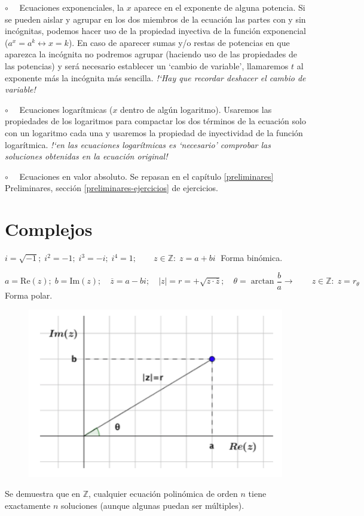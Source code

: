 $\circ \quad$ Ecuaciones exponenciales, la $x$ aparece en el exponente de alguna potencia. Si se pueden aislar y agrupar en los dos miembros de la ecuación las partes con y sin incógnitas, podemos hacer uso de la propiedad inyectiva de la función exponencial ($a^x=a^k \leftrightarrow x=k$). En caso de aparecer sumas y/o restas de potencias en que aparezca la incógnita no podremos agrupar (haciendo uso de las propiedades de las potencias) y será necesario establecer un `cambio de variable', llamaremos $t$ al exponente más la incógnita más sencilla. \emph{!`Hay que recordar deshacer el cambio de variable!}

$\circ \quad$ Ecuaciones logarítmicas ($x$ dentro de algún logaritmo). Usaremos las propiedades de los logaritmos para compactar los dos términos de la ecuación solo con un logaritmo cada una y usaremos la propiedad de inyectividad de la función logarítmica. \emph{!`en las ecuaciones logarítmicas es `necesario' comprobar las soluciones obtenidas en la ecuación original!}

$\circ \quad$ Ecuaciones en valor absoluto. Se repasan en el capítulo \ref{preliminares} Preliminares, sección \ref{preliminares-ejercicios} de ejercicios.

\section{Complejos}
\begin{multicols}{2}
$i=\sqrt{-1}; \; i^2=-1; \; i^3=-i; \; i^4=1;  \qquad z\in \mathbb{Z}:\; z=a+bi\; $ Forma binómica.

$a=\mathrm{Re}(z); \; b= \mathrm{Im}(z); \quad \overline{z}=a-bi  ; \quad |z|=r=+\sqrt{z\cdot \overline{z} }; \quad \theta=\arctan \dfrac b a  \to \qquad z\in \mathbb{Z}:\; z=r_{\theta}\; $ Forma polar.

\begin{figure}[H]
		\centering
		\includegraphics[width=.4\textwidth]{imagenes/apendices/APENDICESIM03.png}
	\end{figure}
\end{multicols}

Se demuestra que en $\mathbb{Z}$, cualquier ecuación polinómica de orden $n$ tiene exactamente $n$ soluciones (aunque algunas puedan ser múltiples).

